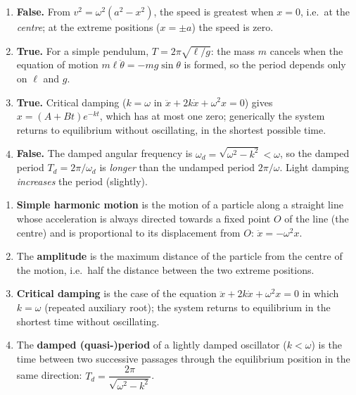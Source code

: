 \documentclass[11pt]{article}
\begin{document}
\begin{corrige}
\begin{enumerate}
\item \textbf{False.} From $v^2 = \omega^2(a^2 - x^2)$, the speed is greatest when $x = 0$, i.e.\ at the \emph{centre}; at the extreme positions ($x = \pm a$) the speed is zero.
\item \textbf{True.} For a simple pendulum, $T = 2\pi\sqrt{\ell/g}$: the mass $m$ cancels when the equation of motion $m\ell\ddot{\theta} = -mg\sin\theta$ is formed, so the period depends only on $\ell$ and $g$.
\item \textbf{True.} Critical damping ($k = \omega$ in $\ddot{x} + 2k\dot{x} + \omega^2 x = 0$) gives $x = (A + Bt)e^{-kt}$, which has at most one zero; generically the system returns to equilibrium without oscillating, in the shortest possible time.
\item \textbf{False.} The damped angular frequency is $\omega_d = \sqrt{\omega^2 - k^2} < \omega$, so the damped period $T_d = 2\pi/\omega_d$ is \emph{longer} than the undamped period $2\pi/\omega$. Light damping \emph{increases} the period (slightly).
\end{enumerate}
\end{corrige}

\begin{corrige}
\begin{enumerate}
\item \textbf{Simple harmonic motion} is the motion of a particle along a straight line whose acceleration is always directed towards a fixed point $O$ of the line (the centre) and is proportional to its displacement from $O$: $\ddot{x} = -\omega^2 x$.
\item The \textbf{amplitude} is the maximum distance of the particle from the centre of the motion, i.e.\ half the distance between the two extreme positions.
\item \textbf{Critical damping} is the case of the equation $\ddot{x} + 2k\dot{x} + \omega^2 x = 0$ in which $k = \omega$ (repeated auxiliary root); the system returns to equilibrium in the shortest time without oscillating.
\item The \textbf{damped (quasi-)period} of a lightly damped oscillator ($k < \omega$) is the time between two successive passages through the equilibrium position in the same direction: $T_d = \dfrac{2\pi}{\sqrt{\omega^2 - k^2}}$.
\end{enumerate}
\end{corrige}
\end{document}
